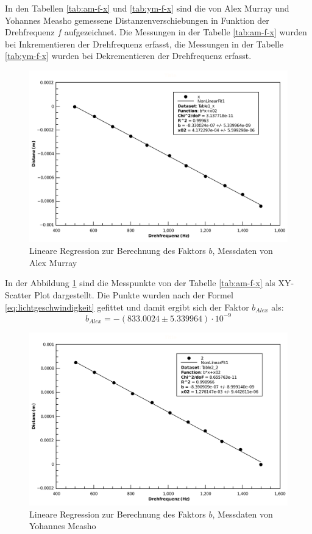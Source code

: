 In den Tabellen \ref{tab:am-f-x} und  \ref{tab:ym-f-x}  sind die von Alex Murray
und   Yohannes   Measho   gemessene  Distanzenverschiebungen  in  Funktion   der
Drehfrequenz  $f$  aufgezeichnet.  Die Messungen in der Tabelle \ref{tab:am-f-x}
wurden bei Inkrementieren der Drehfrequenz erfasst, die Messungen in der Tabelle
\ref{tab:ym-f-x}   wurden   bei   Dekrementieren   der   Drehfrequenz   erfasst.

\begin{figure}[H]
    \center
    \includegraphics[width=.8\textwidth]{images/am-f-x-fit-b.pdf}
    \caption{Lineare Regression zur Berechnung des Faktors $b$, Messdaten von Alex Murray}
    \label{fig:am-f-x-fit-b}
\end{figure}

In  der Abbildung \ref{fig:am-f-x-fit-b} sind die  Messpunkte  von  der  Tabelle
\ref{tab:am-f-x} als  XY-Scatter  Plot  dargestellt.  Die Punkte wurden nach der
Formel \ref{eq:lichtgeschwindigkeit} gefittet und damit ergibt  sich  der Faktor
$b_{Alex}$ als:
\begin{equation}
    b_{Alex} = -(833.0024 \pm 5.339964)\cdot 10^{-9}
    \label{eq:am-b}
\end{equation}

\begin{figure}[H]
    \center
    \includegraphics[width=.8\textwidth]{images/ym-f-x-fit-b.pdf}
    \caption{Lineare Regression zur Berechnung des Faktors $b$, Messdaten von Yohannes Measho}
    \label{fig:ym-f-x-fit-b}
\end{figure}

